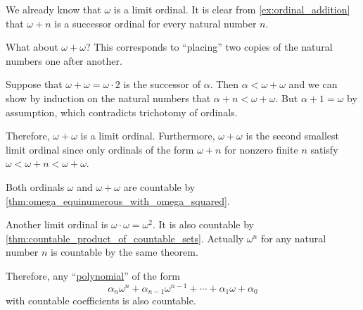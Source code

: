 \begin{example}\label{ex:countable_limit_ordinals}
  We already know that \( \omega \) is a limit ordinal. It is clear from \cref{ex:ordinal_addition} that \( \omega + n \) is a successor ordinal for every natural number \( n \).

  What about \( \omega + \omega \)? This corresponds to \enquote{placing} two copies of the natural numbers one after another.

  Suppose that \( \omega + \omega = \omega \cdot 2 \) is the successor of \( \alpha \). Then \( \alpha < \omega + \omega \) and we can show by induction on the natural numbers that \( \alpha + n < \omega + \omega \). But \( \alpha + 1 = \omega \) by assumption, which contradicts trichotomy of ordinals.

  Therefore, \( \omega + \omega \) is a limit ordinal. Furthermore, \( \omega + \omega \) is the second smallest limit ordinal since only ordinals of the form \( \omega + n \) for nonzero finite \( n \) satisfy \( \omega < \omega + n < \omega + \omega \).

  Both ordinals \( \omega \) and \( \omega + \omega \) are countable by \cref{thm:omega_equinumerous_with_omega_squared}.

  Another limit ordinal is \( \omega \cdot \omega = \omega^2 \). It is also countable by \cref{thm:countable_product_of_countable_sets}. Actually \( \omega^n \) for any natural number \( n \) is countable by the same theorem.

  Therefore, any \enquote{\hyperref[def:polynomial_algebra/polynomials]{polynomial}} of the form
  \begin{equation*}
    \alpha_n \omega^n + \alpha_{n-1} \omega^{n-1} + \cdots + \alpha_1 \omega + \alpha_0
  \end{equation*}
  with countable coefficients is also countable.
\end{example}

